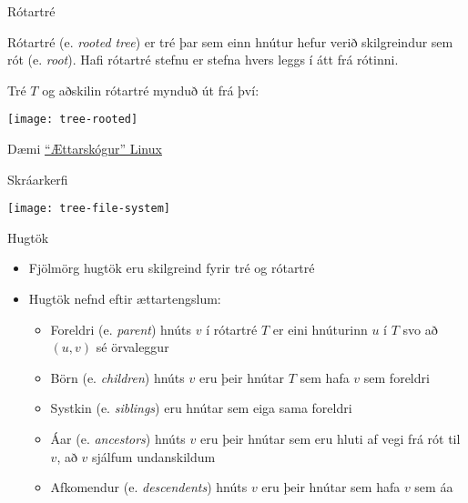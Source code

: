 \documentclass[handout]{beamer}
\begin{document}
\begin{frame}{Rótartré}
\begin{tcolorbox}[title=Rótartré]
Rótartré (e. \emph{rooted tree}) er tré þar sem einn hnútur hefur verið skilgreindur sem rót (e. \emph{root}). Hafi rótartré stefnu er stefna hvers leggs í átt frá rótinni.
\end{tcolorbox}
Tré $T$ og aðskilin rótartré mynduð út frá því:
\begin{center}
\texttt{[image: tree-rooted]}
\end{center}
\end{frame}

\begin{frame}{Dæmi}
\href{https://upload.wikimedia.org/wikipedia/commons/1/1b/Linux_Distribution_Timeline.svg}{``Ættarskógur'' Linux}
\end{frame}

\begin{frame}{Skráarkerfi}
\begin{center}
\texttt{[image: tree-file-system]}
\end{center}
\end{frame}

\begin{frame}{Hugtök}
\begin{itemize}
 \item Fjölmörg hugtök eru skilgreind fyrir tré og rótartré
 \item Hugtök nefnd eftir ættartengslum:
 \begin{itemize}
  \item Foreldri (e. \emph{parent}) hnúts $v$ í rótartré $T$ er eini hnúturinn $u$ í $T$ svo að $(u,v)$ sé örvaleggur
  \item Börn (e. \emph{children}) hnúts $v$ eru þeir hnútar $T$ sem hafa $v$ sem foreldri
  \item Systkin (e. \emph{siblings}) eru hnútar sem eiga sama foreldri
  \item Áar (e. \emph{ancestors}) hnúts $v$ eru þeir hnútar sem eru hluti af vegi frá rót til $v$, að $v$ sjálfum undanskildum
  \item Afkomendur (e. \emph{descendents}) hnúts $v$ eru þeir hnútar sem hafa $v$ sem áa
 \end{itemize}
\end{itemize}
\end{frame}
\end{document}
